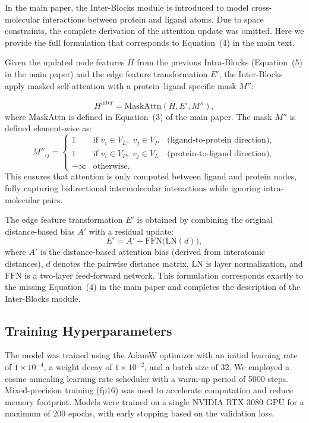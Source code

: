 ﻿\documentclass[11pt,a4paper]{article}
\begin{document}
In the main paper, the Inter-Blocks module is introduced to model cross-molecular interactions between protein and ligand atoms. Due to space constraints, the complete derivation of the attention update was omitted. Here we provide the full formulation that corresponds to Equation~(4) in the main text.

Given the updated node features $H$ from the previous Intra-Blocks (Equation~(5) in the main paper) and the edge feature transformation $E'$, the Inter-Blocks apply masked self-attention with a protein–ligand specific mask $M''$:

\begin{equation}
H^{\text{inter}} = \mathrm{MaskAttn}(H, E', M''),
\end{equation}
where $\mathrm{MaskAttn}$ is defined in Equation~(3) of the main paper. The mask $M''$ is defined element-wise as:
\begin{equation}
M''_{ij} = \begin{cases}
1 & \text{if } v_i \in V_L,\; v_j \in V_P \quad \text{(ligand-to-protein direction)},\\
1 & \text{if } v_i \in V_P,\; v_j \in V_L \quad \text{(protein-to-ligand direction)},\\
-\infty & \text{otherwise}.
\end{cases}
\end{equation}
This ensures that attention is only computed between ligand and protein nodes, fully capturing bidirectional intermolecular interactions while ignoring intra-molecular pairs.

The edge feature transformation $E'$ is obtained by combining the original distance-based bias $A'$ with a residual update:
\begin{equation}
E' = A' + \mathrm{FFN}\bigl(\mathrm{LN}(d)\bigr),
\end{equation}
where $A'$ is the distance‑based attention bias (derived from interatomic distances), $d$ denotes the pairwise distance matrix, $\mathrm{LN}$ is layer normalization, and $\mathrm{FFN}$ is a two‑layer feed‑forward network. This formulation corresponds exactly to the missing Equation~(4) in the main paper and completes the description of the Inter-Blocks module.

\subsection{Training Hyperparameters}
The model was trained using the AdamW optimizer with an initial learning rate of $1\times10^{-4}$, a weight decay of $1\times10^{-2}$, and a batch size of 32. We employed a cosine annealing learning rate scheduler with a warm-up period of 5000 steps. Mixed-precision training (fp16) was used to accelerate computation and reduce memory footprint. Models were trained on a single NVIDIA RTX 3080 GPU for a maximum of 200 epochs, with early stopping based on the validation loss.
\end{document}
